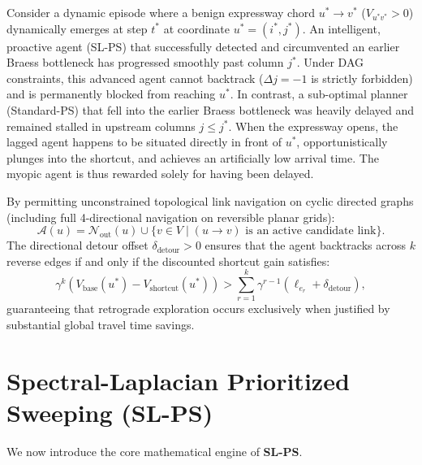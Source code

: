 \documentclass[11pt,a4paper]{article}
\begin{document}
Consider a dynamic episode where a benign expressway chord $u^* \to v^*$ ($V_{u^* v^*} > 0$) dynamically emerges at step $t^*$ at coordinate $u^* = (i^*, j^*)$. An intelligent, proactive agent (SL-PS) that successfully detected and circumvented an earlier Braess bottleneck has progressed smoothly past column $j^*$. Under DAG constraints, this advanced agent cannot backtrack ($\Delta j = -1$ is strictly forbidden) and is permanently blocked from reaching $u^*$. In contrast, a sub-optimal planner (Standard-PS) that fell into the earlier Braess bottleneck was heavily delayed and remained stalled in upstream columns $j \le j^*$. When the expressway opens, the lagged agent happens to be situated directly in front of $u^*$, opportunistically plunges into the shortcut, and achieves an artificially low arrival time. The myopic agent is thus rewarded solely for having been delayed.

By permitting unconstrained topological link navigation on cyclic directed graphs (including full 4-directional navigation on reversible planar grids):
\begin{equation}
\mathcal{A}(u) = \mathcal{N}_{\text{out}}(u) \cup \{ v \in V \mid (u \to v) \text{ is an active candidate link} \}.
\end{equation}
The directional detour offset $\delta_{\text{detour}} > 0$ ensures that the agent backtracks across $k$ reverse edges if and only if the discounted shortcut gain satisfies:
\begin{equation}
\label{eq:detour_condition}
\gamma^k \left( V_{\text{base}}(u^*) - V_{\text{shortcut}}(u^*) \right) > \sum_{r=1}^k \gamma^{r-1} \left( \ell_{e_r} + \delta_{\text{detour}} \right),
\end{equation}
guaranteeing that retrograde exploration occurs exclusively when justified by substantial global travel time savings.

\section{Spectral-Laplacian Prioritized Sweeping (SL-PS)}
\label{sec:method}

We now introduce the core mathematical engine of \textbf{SL-PS}.
\end{document}
